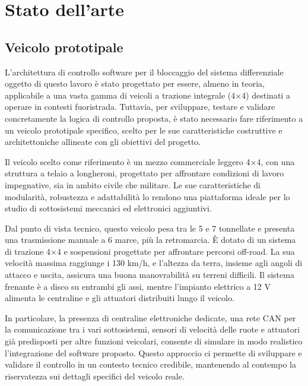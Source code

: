 \documentclass[11pt]{report}
\begin{document}
	
	\chapter{Stato dell'arte}
	
	\section{Veicolo prototipale}

	L'architettura di controllo software per il bloccaggio del sistema differenziale oggetto di questo lavoro è stato progettato per essere, almeno in teoria, applicabile a una vasta gamma di veicoli a trazione integrale (4×4) destinati a operare in contesti fuoristrada. Tuttavia, per sviluppare, testare e validare concretamente la logica di controllo proposta, è stato necessario fare riferimento a un veicolo prototipale specifico, scelto per le sue caratteristiche costruttive e architettoniche allineate con gli obiettivi del progetto.
	
	Il veicolo scelto come riferimento è un mezzo commerciale leggero 4×4, con una struttura a telaio a longheroni, progettato per affrontare condizioni di lavoro impegnative, sia in ambito civile che militare. Le sue caratteristiche di modularità, robustezza e adattabilità lo rendono una piattaforma ideale per lo studio di  sottosistemi meccanici ed elettronici aggiuntivi.
	
	Dal punto di vista tecnico, questo veicolo pesa tra le 5 e 7 tonnellate e presenta una trasmissione manuale a 6 marce, più la retromarcia. È dotato di un sistema di trazione 4×4 e sospensioni progettate per affrontare percorsi off-road. La sua velocità massima raggiunge i 130 km/h, e l'altezza da terra, insieme agli angoli di attacco e uscita, assicura una buona manovrabilità su terreni difficili. Il sistema frenante è a disco su entrambi gli assi, mentre l'impianto elettrico a 12 V alimenta le centraline e gli attuatori distribuiti lungo il veicolo.
	
	In particolare, la presenza di centraline elettroniche dedicate, una rete CAN per la comunicazione tra i vari sottosistemi, sensori di velocità delle ruote e attuatori già predisposti per altre funzioni veicolari, consente di simulare in modo realistico l’integrazione del software proposto. Questo approccio ci permette di sviluppare e validare il controllo in un contesto tecnico credibile, mantenendo al contempo la riservatezza sui dettagli specifici del veicolo reale.
	
	
	
\end{document}
